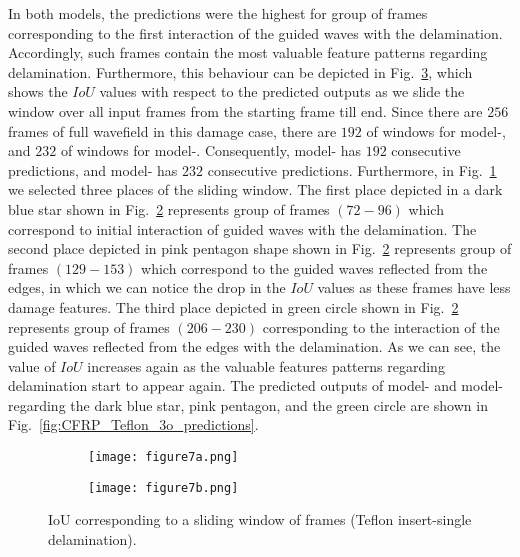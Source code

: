 In both models, the predictions were the highest for group of frames corresponding to the first interaction of the guided waves with the delamination.
Accordingly, such frames contain the most valuable feature patterns regarding delamination. 
Furthermore, this behaviour can be depicted in Fig.~\ref{fig:CFRP_Teflon_3o_IoU_centre_window}, which shows the \(IoU\) values with respect to the predicted outputs as we slide the window over all input frames from the starting frame till end.
Since there are \(256\) frames of full wavefield in this damage case, there are \(192\) of windows for model-, and \(232\) of windows for model-.
Consequently, model- has \(192\) consecutive predictions, and model- has \(232\) consecutive predictions.
Furthermore, in Fig.~\ref{fig:CFRP_Teflon_3o_IoU_} we selected three places of the sliding window. 
The first place depicted in a dark blue star shown in Fig.~\ref{fig:CFRP_teflon_3o_shapes_} represents group of frames \((72-96)\) which correspond to initial interaction of guided waves with the delamination.
The second place depicted in pink pentagon shape shown in Fig.~\ref{fig:CFRP_teflon_3o_shapes_} represents group of frames \((129-153)\) which correspond to the guided waves reflected from the edges, in which we can notice the drop in the \(IoU\) values as these frames have less damage features.
The third place depicted in green circle shown in Fig.~\ref{fig:CFRP_teflon_3o_shapes_} represents group of frames \((206-230)\) corresponding to the interaction of the guided waves reflected from the edges with the delamination.
As we can see, the value of \(IoU\) increases again as the valuable features patterns regarding delamination start to appear again.
The predicted outputs of model- and model- regarding the dark blue star, pink pentagon, and the green circle are shown in Fig.~\ref{fig:CFRP_Teflon_3o_predictions}.
\begin{figure} [!h]
	\begin{subfigure}[b]{1\textwidth}
		\centering
		\texttt{[image: figure7a.png]}
		\caption{}
		\label{fig:CFRP_Teflon_3o_IoU_}
	\end{subfigure}
	\par\medskip
	\begin{subfigure}[b]{1\textwidth}
		\centering
		\texttt{[image: figure7b.png]}
		\caption{} 
		\label{fig:CFRP_teflon_3o_shapes_}
	\end{subfigure}
	\caption{IoU corresponding to a sliding window of frames (Teflon insert-single delamination).}
	\label{fig:CFRP_Teflon_3o_IoU_centre_window}
\end{figure} 
